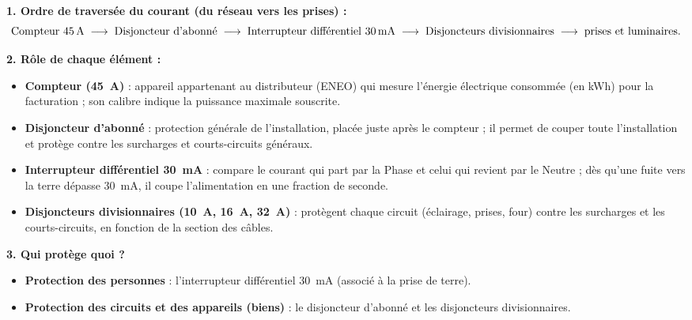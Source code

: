 \documentclass[11pt]{article}
\begin{document}
\begin{corrige}
\textbf{1. Ordre de traversée du courant (du réseau vers les prises) :}
\[
\text{Compteur \SI{45}{A}} \;\longrightarrow\; \text{Disjoncteur d'abonné} \;\longrightarrow\; \text{Interrupteur différentiel \SI{30}{mA}} \;\longrightarrow\; \text{Disjoncteurs divisionnaires} \;\longrightarrow\; \text{prises et luminaires.}
\]

\textbf{2. Rôle de chaque élément :}
\begin{itemize}
\item \textbf{Compteur (\SI{45}{A})} : appareil appartenant au distributeur (ENEO) qui mesure l'énergie électrique consommée (en kWh) pour la facturation ; son calibre indique la puissance maximale souscrite.
\item \textbf{Disjoncteur d'abonné} : protection générale de l'installation, placée juste après le compteur ; il permet de couper toute l'installation et protège contre les surcharges et courts-circuits généraux.
\item \textbf{Interrupteur différentiel \SI{30}{mA}} : compare le courant qui part par la Phase et celui qui revient par le Neutre ; dès qu'une fuite vers la terre dépasse \SI{30}{mA}, il coupe l'alimentation en une fraction de seconde.
\item \textbf{Disjoncteurs divisionnaires (\SI{10}{A}, \SI{16}{A}, \SI{32}{A})} : protègent chaque circuit (éclairage, prises, four) contre les surcharges et les courts-circuits, en fonction de la section des câbles.
\end{itemize}

\textbf{3. Qui protège quoi ?}
\begin{itemize}
\item \textbf{Protection des personnes} : l'interrupteur différentiel \SI{30}{mA} (associé à la prise de terre).
\item \textbf{Protection des circuits et des appareils (biens)} : le disjoncteur d'abonné et les disjoncteurs divisionnaires.
\end{itemize}
\end{corrige}
\end{document}
